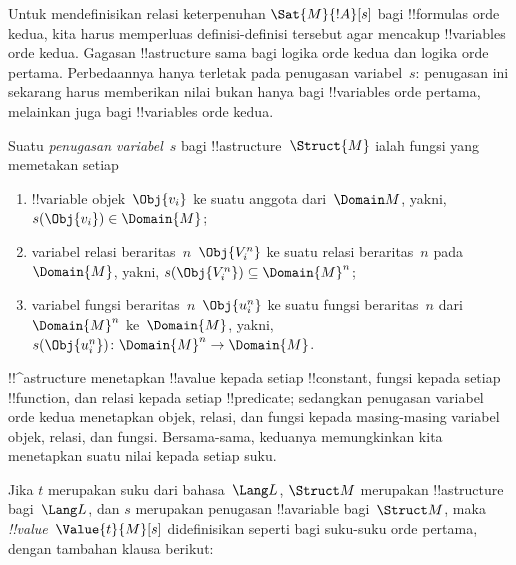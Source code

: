 \documentclass[../../../include/open-logic-section]{subfiles}
\begin{document}


\begin{explain}
Untuk mendefinisikan relasi keterpenuhan $\Sat{M}{!A}[s]$ bagi !!{formula}s
orde kedua, kita harus memperluas definisi-definisi tersebut agar mencakup
!!{variable}s orde kedua. Gagasan !!a{structure} sama bagi logika orde kedua
dan logika orde pertama. Perbedaannya hanya terletak pada penugasan
variabel~$s$: penugasan ini sekarang harus memberikan nilai bukan hanya bagi
!!{variable}s orde pertama, melainkan juga bagi !!{variable}s orde kedua.
\end{explain}

\begin{defn}
Suatu \emph{penugasan variabel}~$s$ bagi !!a{structure}~$\Struct{M}$ ialah
fungsi yang memetakan setiap
\begin{enumerate}
\item !!{variable} objek~$\Obj{v_i}$ ke suatu anggota dari~$\Domain M$,
  yakni, $s(\Obj{v_i}) \in \Domain{M}$;
\item variabel relasi beraritas~$n$~$\Obj{V_i^n}$ ke suatu relasi
  beraritas~$n$ pada~$\Domain{M}$, yakni,
  $s(\Obj{V_i^n}) \subseteq \Domain{M}^n$;
\item variabel fungsi beraritas~$n$~$\Obj{u_i^n}$ ke suatu fungsi
  beraritas~$n$ dari $\Domain{M}^n$ ke~$\Domain{M}$, yakni,
  $s(\Obj{u_i^n})\colon \Domain{M}^n \to \Domain{M}$.
\end{enumerate}
\end{defn}

\begin{explain}
!!^a{structure} menetapkan !!a{value} kepada setiap !!{constant}, fungsi
kepada setiap !!{function}, dan relasi kepada setiap !!{predicate}; sedangkan
penugasan variabel orde kedua menetapkan objek, relasi, dan fungsi kepada
masing-masing variabel objek, relasi, dan fungsi. Bersama-sama, keduanya
memungkinkan kita menetapkan suatu nilai kepada setiap suku.
\end{explain}

\begin{defn}
Jika $t$ merupakan suku dari bahasa~$\Lang L$, $\Struct M$ merupakan
!!a{structure} bagi~$\Lang L$, dan $s$ merupakan penugasan
!!a{variable} bagi~$\Struct M$, maka \emph{!!{value}}~$\Value{t}{M}[s]$
didefinisikan seperti bagi suku-suku orde pertama, dengan tambahan klausa
berikut:
\begin{quote}
\end{quote}
\end{defn}
\end{document}
